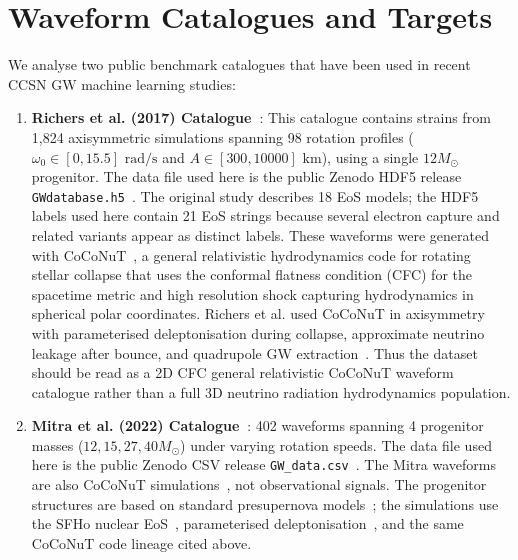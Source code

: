 \documentclass[reprint,aps,prd,floatfix,nofootinbib,superscriptaddress,showpacs]{revtex4-2}
\begin{document}
\section{Waveform Catalogues and Targets}
We analyse two public benchmark catalogues that have been used in recent CCSN GW machine learning studies:
\begin{enumerate}
    \item \textbf{Richers et al. (2017) Catalogue~\cite{richers2017}}: This catalogue contains strains from 1,824 axisymmetric simulations spanning 98 rotation profiles ($\omega_0 \in [0, 15.5]\text{ rad/s}$ and $A \in [300, 10000]\text{ km}$), using a single $12 M_\odot$ progenitor. The data file used here is the public Zenodo HDF5 release \texttt{GWdatabase.h5}~\cite{richersZenodo}. The original study describes 18 EoS models; the HDF5 labels used here contain 21 EoS strings because several electron capture and related variants appear as distinct labels. These waveforms were generated with CoCoNuT~\cite{dimmelmeier2002,dimmelmeier2005}, a general relativistic hydrodynamics code for rotating stellar collapse that uses the conformal flatness condition (CFC) for the spacetime metric and high resolution shock capturing hydrodynamics in spherical polar coordinates. Richers et al. used CoCoNuT in axisymmetry with parameterised deleptonisation during collapse, approximate neutrino leakage after bounce, and quadrupole GW extraction~\cite{richers2017,abdikamalov2014}. Thus the dataset should be read as a 2D CFC general relativistic CoCoNuT waveform catalogue rather than a full 3D neutrino radiation hydrodynamics population.
    \item \textbf{Mitra et al. (2022) Catalogue~\cite{mitra2022}}: 402 waveforms spanning 4 progenitor masses ($12, 15, 27, 40 M_\odot$) under varying rotation speeds. The data file used here is the public Zenodo CSV release \texttt{GW\_data.csv}~\cite{mitraZenodo}. The Mitra waveforms are also CoCoNuT simulations~\cite{dimmelmeier2002,dimmelmeier2005}, not observational signals. The progenitor structures are based on standard presupernova models~\cite{woosley2002,heger2005,woosley2007}; the simulations use the SFHo nuclear EoS~\cite{steiner2013}, parameterised deleptonisation~\cite{liebendoerfer2005}, and the same CoCoNuT code lineage cited above.
\end{enumerate}
\end{document}
